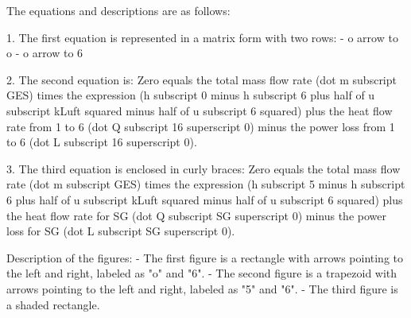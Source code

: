 The equations and descriptions are as follows:

1. The first equation is represented in a matrix form with two rows:
   - o arrow to o
   - o arrow to 6

2. The second equation is:
   Zero equals the total mass flow rate (dot m subscript GES) times the expression (h subscript 0 minus h subscript 6 plus half of u subscript kLuft squared minus half of u subscript 6 squared) plus the heat flow rate from 1 to 6 (dot Q subscript 16 superscript 0) minus the power loss from 1 to 6 (dot L subscript 16 superscript 0).

3. The third equation is enclosed in curly braces:
   Zero equals the total mass flow rate (dot m subscript GES) times the expression (h subscript 5 minus h subscript 6 plus half of u subscript kLuft squared minus half of u subscript 6 squared) plus the heat flow rate for SG (dot Q subscript SG superscript 0) minus the power loss for SG (dot L subscript SG superscript 0).

Description of the figures:
- The first figure is a rectangle with arrows pointing to the left and right, labeled as "o" and "6".
- The second figure is a trapezoid with arrows pointing to the left and right, labeled as "5" and "6".
- The third figure is a shaded rectangle.